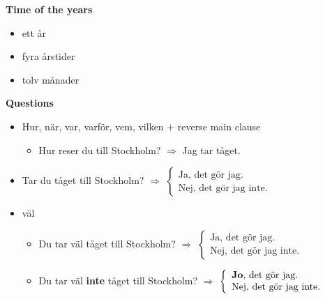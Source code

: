 
\begin{flushleft}
    \textbf{Time of the years}
    \begin{itemize}
        \item ett år
        \item fyra årstider
        \item tolv månader
    \end{itemize}

    \textbf{Questions}
    \begin{itemize}
        \item Hur, när, var, varför, vem, vilken $+$ reverse main clause
        \begin{itemize}
            \item Hur reser du till Stockholm? $\Rightarrow$ Jag tar tåget.
        \end{itemize}
        \item Tar du tåget till Stockholm? $\Rightarrow$ $\left\{
            \begin{array}{l}
                \text{Ja, det gör jag.} \\
                \text{Nej, det gör jag inte.}
            \end{array}
        \right.$
        \item väl
        \begin{itemize}
            \item Du tar väl tåget till Stockholm? $\Rightarrow$ $\left\{
                \begin{array}{l}
                    \text{Ja, det gör jag.} \\
                    \text{Nej, det gör jag inte.}
                \end{array}
            \right.$
            \item Du tar väl \textbf{inte} tåget till Stockholm? $\Rightarrow$ $\left\{
                \begin{array}{l}
                    \text{\textbf{Jo}, det gör jag.} \\
                    \text{Nej, det gör jag inte.}
                \end{array}
            \right.$
        \end{itemize}
    \end{itemize}
\end{flushleft}

